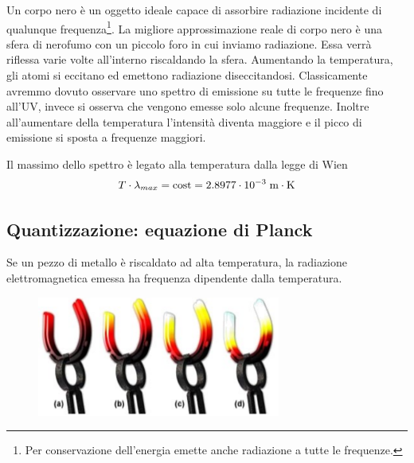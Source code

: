 Un corpo nero è un oggetto ideale capace di assorbire radiazione incidente di qualunque frequenza\footnote{Per conservazione dell'energia emette anche radiazione a tutte le frequenze.}. La migliore approssimazione reale di corpo nero è una sfera di nerofumo con un piccolo foro in cui inviamo radiazione. Essa verrà riflessa varie volte all'interno riscaldando la sfera. Aumentando la temperatura, gli atomi si eccitano ed emettono radiazione diseccitandosi. Classicamente avremmo dovuto osservare uno spettro di emissione su tutte le frequenze fino all'UV, invece si osserva che vengono emesse solo alcune frequenze. Inoltre all'aumentare della temperatura l'intensità diventa maggiore e il picco di emissione si sposta a frequenze maggiori. 

Il massimo dello spettro è legato alla temperatura dalla legge di Wien 
$$T\cdot\lambda_{max}= \text{cost}= 2.8977\cdot 10^{-3} \; \rm m \cdot K$$


\subsection{Quantizzazione: equazione di Planck}%
Se un pezzo di metallo è riscaldato ad alta temperatura, la radiazione elettromagnetica emessa ha frequenza dipendente dalla temperatura. 

\begin{figure}[htp]
  \centering
  \includegraphics[width=8cm]{immagini/ferro_incandescente.png}
\end{figure}

